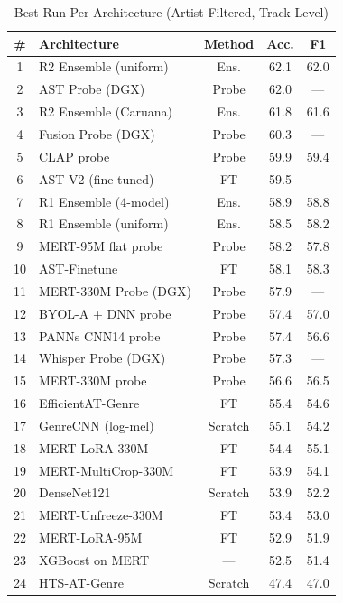 \documentclass[conference]{IEEEtran}
\begin{document}
\begin{table}[t]
\centering
\caption{Best Run Per Architecture (Artist-Filtered, Track-Level)}
\label{tab:best}
\scriptsize
\begin{tabular}{clccc}
\toprule
\textbf{\#} & \textbf{Architecture} & \textbf{Method} & \textbf{Acc.} & \textbf{F1} \\
\midrule
1 & R2 Ensemble (uniform) \cite{kittler1998combining} & Ens. & 62.1 & 62.0 \\
2 & AST Probe (DGX) \cite{gong2021ast} & Probe & 62.0 & --- \\
3 & R2 Ensemble (Caruana) \cite{kittler1998combining} & Ens. & 61.8 & 61.6 \\
4 & Fusion Probe (DGX) & Probe & 60.3 & --- \\
5 & CLAP probe \cite{wu2023clap} & Probe & 59.9 & 59.4 \\
6 & AST-V2 (fine-tuned) \cite{gong2021ast} & FT & 59.5 & --- \\
7 & R1 Ensemble (4-model) \cite{kittler1998combining} & Ens. & 58.9 & 58.8 \\
8 & R1 Ensemble (uniform) \cite{kittler1998combining} & Ens. & 58.5 & 58.2 \\
9 & MERT-95M flat probe \cite{li2023mert} & Probe & 58.2 & 57.8 \\
10 & AST-Finetune \cite{gong2021ast} & FT & 58.1 & 58.3 \\
11 & MERT-330M Probe (DGX) \cite{li2023mert} & Probe & 57.9 & --- \\
12 & BYOL-A + DNN probe \cite{niizumi2023byola} & Probe & 57.4 & 57.0 \\
13 & PANNs CNN14 probe \cite{kong2020panns} & Probe & 57.4 & 56.6 \\
14 & Whisper Probe (DGX) \cite{radford2023whisper} & Probe & 57.3 & --- \\
15 & MERT-330M probe \cite{li2023mert} & Probe & 56.6 & 56.5 \\
16 & EfficientAT-Genre \cite{schmid2023efficientat} & FT & 55.4 & 54.6 \\
17 & GenreCNN (log-mel) \cite{choi2017transfer} & Scratch & 55.1 & 54.2 \\
18 & MERT-LoRA-330M \cite{li2023mert,hu2021lora} & FT & 54.4 & 55.1 \\
19 & MERT-MultiCrop-330M \cite{li2023mert} & FT & 53.9 & 54.1 \\
20 & DenseNet121 \cite{huang2017densenet} & Scratch & 53.9 & 52.2 \\
21 & MERT-Unfreeze-330M \cite{li2023mert} & FT & 53.4 & 53.0 \\
22 & MERT-LoRA-95M \cite{li2023mert,hu2021lora} & FT & 52.9 & 51.9 \\
23 & XGBoost on MERT \cite{chen2016xgboost} & --- & 52.5 & 51.4 \\
24 & HTS-AT-Genre \cite{chen2022htsat} & Scratch & 47.4 & 47.0 \\
\bottomrule
\end{tabular}
\end{table}
\end{document}
